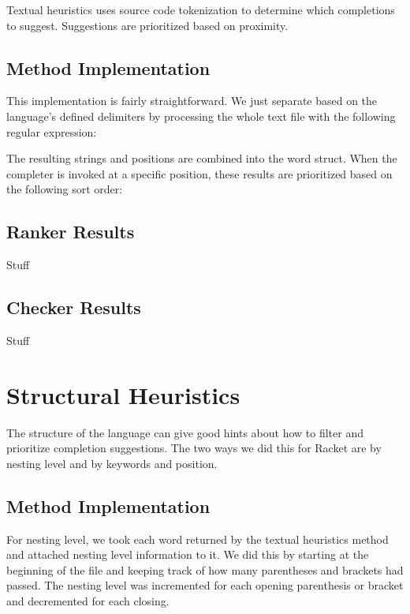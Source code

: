 \documentclass[ms,electronic,twosidetoc,letterpaper,chaptercenter,parttop,lol,lof,lot]{byumsphd}
\begin{document}
Textual heuristics uses source code tokenization to determine which completions to suggest. Suggestions are prioritized based on proximity.

\subsection{Method Implementation}

This implementation is fairly straightforward. We just separate based on the language's defined delimiters by processing the whole text file with the following regular expression: \scheme{[^\s()[]",'`#|\;]+}

The resulting strings and positions are combined into the word struct. When the completer is invoked at a specific position, these results are prioritized based on the following sort order:


\subsection{Ranker Results}

Stuff

\subsection{Checker Results}

Stuff

\section{Structural Heuristics}

The structure of the language can give good hints about how to filter and prioritize completion suggestions. The two ways we did this for Racket are by nesting level and by keywords and position.

\subsection{Method Implementation}

For nesting level, we took each word returned by the textual heuristics method and attached nesting level information to it. We did this by starting at the beginning of the file and keeping track of how many parentheses and brackets had passed. The nesting level was incremented for each opening parenthesis or bracket and decremented for each closing.
\end{document}
